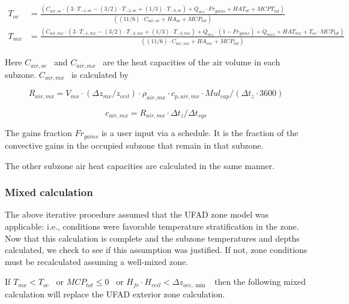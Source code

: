 \begin{equation}
  \begin{array}{cl}
    T_{oc} & = \frac{(C_{air,oc} \cdot (3 \cdot T_{ - 1,oc} - (3/2) \cdot T_{ - 2,oc} + (1/3) \cdot T_{ - 3,oc}) + \dot Q_{ocz} \cdot Fr_{gains} + HAT_{oc} + MCPT_{tot})} {((11/6) \cdot C_{air,oc} + HA_{oc} + MCP_{tot})} \\
    T_{mx} & = \frac{(C_{air,mx} \cdot (3 \cdot T_{ - 1,mx} - (3/2) \cdot T_{ - 2,mx} + (1/3) \cdot T_{ - 3,mx}) + \dot Q_{ocz} \cdot (1 - Fr_{gains}) + \dot Q_{mxz} + HAT_{mx} + T_{oc} \cdot MCP_{tot})} {((11/6) \cdot C_{air,mx} + HA_{mx} + MCP_{tot})}
  \end{array}
\end{equation}

Here \({C_{air,oc}}\) ~and \({C_{air,mx}}\) ~are the heat capacities of the air volume in each subzone. \({C_{air,mx}}\) ~is calculated by

\begin{equation}
{R_{air,mx}} = {V_{mx}} \cdot \left( {\Delta {z_{mx}}/{z_{ceil}}} \right) \cdot {\rho_{air,mx}} \cdot {c_{p,air,mx}} \cdot Mu{l_{cap}}/\left( {\Delta {t_z} \cdot 3600} \right)
\end{equation}

\begin{equation}
{c_{air,mx}} = {R_{air,mx}} \cdot \Delta {t_z}/\Delta {t_{sys}}
\end{equation}

The gains fraction \(F{r_{gains}}\) is a user input via a schedule. It is the fraction of the convective gains in the occupied subzone that remain in that subzone.

The other subzone air heat capacities are calculated in the same manner.

\subsubsection{Mixed calculation}\label{mixed-calculation-2}

The above iterative procedure assumed that the UFAD zone model was applicable: i.e., conditions were favorable temperature stratification in the zone. Now that this calculation is complete and the subzone temperatures and depths calculated, we check to see if this assumption was justified. If not, zone conditions must be recalculated assuming a well-mixed zone.

If \({T_{mx}} < {T_{oc}}\) ~or \(MC{P_{tot}} \le 0\) ~or \({H_{fr}} \cdot {H_{ceil}} < \Delta {z_{occ,\min }}\) ~then the following mixed calculation will replace the UFAD exterior zone calculation.

